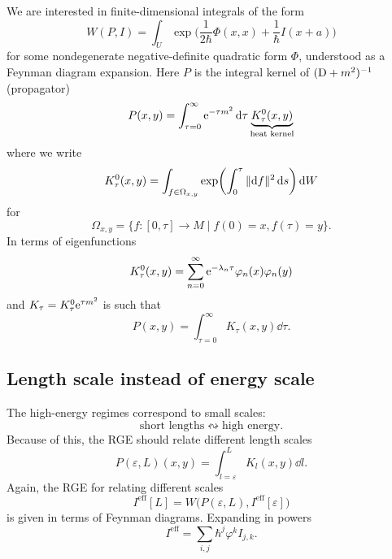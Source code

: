We are interested in finite-dimensional integrals of the form
\begin{equation*}
  W(P, I)
  = \int_U \exp \biggl( 
    \frac{1}{2 \hbar} \Phi (x, x)
    + \frac{1}{\hbar} I(x + a)
  \biggr) 
\end{equation*}
for some nondegenerate negative-definite quadratic form $\Phi$, understood as a Feynman diagram expansion.
Here $P$ is the integral kernel of $(\mathrm{D} + m^2)^{-1}$ (propagator)
\begin{equation*}
  P(x, y) = \int_{\tau = 0}^\infty \mathrm{e}^{-\tau m^2} \, \mathrm{d} \tau
  \underbrace{K_\tau^0 (x, y)}_{\text{heat kernel}}
\end{equation*}
where we write
\begin{equation*}
  K_\tau^0 (x, y)
  = \int_{f \in \Omega_{x, y}}
  \exp \biggl( \int_0^\tau \| \mathrm{d} f \|^2 \, \mathrm{d} s \biggr) \, \mathrm{d} W
\end{equation*}
for
\begin{equation*}
  \Omega_{x, y} = \{
    f : [0, \tau] \to M \mid f(0) = x, f(\tau) = y
  \}.
\end{equation*}
In terms of eigenfunctions
\begin{equation*}
  K_\tau^0 (x, y) 
  = \sum_{n=0}^\infty \mathrm{e}^{-\lambda_n \tau}
  \varphi_n (x) \varphi_n (y)
\end{equation*}
and $K_\tau = K_\tau^0 \mathrm{e}^{\tau m^2}$ is such that
\begin{equation*}
  P(x, y) = \int_{\tau = 0}^\infty K_\tau (x, y) \dd \tau.
\end{equation*}

\subsection{Length scale instead of energy scale}

The high-energy regimes correspond to small scales:
\begin{equation*}
  \text{short lengths} \leftrightsquigarrow
  \text{high energy}.
\end{equation*}
Because of this, the RGE should relate different length scales
\begin{equation*}
  P(\varepsilon, L) (x, y)
  = \int_{l=\varepsilon}^{L} K_l(x, y) \dd l.
\end{equation*}
Again, the RGE for relating different scales
\begin{equation*}
  I^\text{eff}[L] = W\bigl(P(\varepsilon, L), I^\text{eff}[\varepsilon]\bigr)
\end{equation*}
is given in terms of Feynman diagrams.
Expanding in powers
\begin{equation*}
  I^\text{eff} = \sum_{i, j} \hbar^j \varphi^k I_{j, k}.
\end{equation*}

